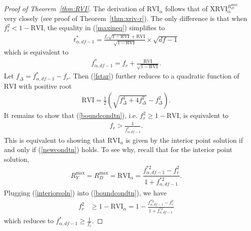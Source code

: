 \documentclass[sts]{imsart}
\theoremstyle{plain}
\theoremstyle{definition}
\newcommand{\df}{df}
\newcommand{\Rymax}{R^{\max }_{Y}}
\newcommand{\Rdmax}{R^{\max }_{D}}
\newcommand{\fstar}{f^*_{\alpha, \df-1}}
\newcommand{\fstarsq}{f^{* 2}_{\alpha, \df-1}}
\newcommand{\tstar}{t^*_{\alpha, \df-1}}
\newcommand{\XRVI}{\text{XRVI}}
\newcommand{\RVI}{\text{RVI}}
\begin{document}
\begin{appendix}
\begin{proof}[Proof of Theorem~\ref{thm:RVI}] 
    The derivation of $\RVI_{\alpha}$ follows that of $\XRVI^{\Rdmax}_{\alpha}$ very closely (see proof of Theorem~\ref{thm:xriv-r}). The only difference is that when $f_{r} ^2 < 1-\RVI$, the equality in (\ref{maxineq}) simplifies to
    \begin{align*}
        \tstar = \frac{f_{r} \sqrt{1-\RVI} + \RVI}{\sqrt{1-\RVI}} \times \sqrt{\df-1}
    \end{align*}
    which is equivalent to 
    \begin{align}
        \fstar = f_{r}  + \frac{\RVI}{\sqrt{1-\RVI}}. \label{fstar}
    \end{align}
    Let $f_\Delta = \fstar - f_{r} $. Then (\ref{fstar}) further reduces to a quadratic function of $\RVI$ with positive root 
    \begin{align*}
        \RVI = \frac{1}{2}(\sqrt{f_\Delta^4 + 4f_\Delta^2}-f_\Delta^2).
    \end{align*} 
    It remains to show that (\ref{boundcondtn}),
       i.e. $f_{r} ^2 \geq 1-\RVI$,
    is equivalent to 
    \begin{align}
        f_{r}  > \frac{1}{\fstar}. \label{newcondtn}
    \end{align}
    This is equivalent to showing that $\RVI_{\alpha}$ is given by the interior point solution if and only if (\ref{newcondtn}) holds. To see why, recall that for the interior point solution, 
    \begin{align}
        \Rymax = \Rdmax = \RVI_{\alpha} = \dfrac{\fstarsq - f_{r} ^2}{1+\fstarsq}. \label{interiorsoln}
    \end{align}
    Plugging (\ref{interiorsoln}) into (\ref{boundcondtn}), we have
    \begin{align*}
        f_{r} ^2 &\geq 1-\RVI_{\alpha}  
        =  1-\frac{\fstarsq - f_{r} ^2}{1+\fstarsq}
    \end{align*}
    which reduces to
        $\fstar \geq \frac{1}{f_{r} }$.
\end{proof}

\end{appendix}
%
%
\end{document}
